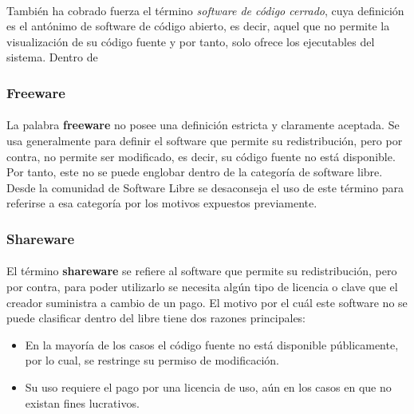 \documentclass[10pt]{article}
\begin{document}
                \paragraph{}
				También ha cobrado fuerza el término \emph{software de código cerrado}, cuya definición es el antónimo de software de código abierto, es decir, aquel que no permite la visualización de su código fuente y por tanto, solo ofrece los ejecutables del sistema. Dentro de 
   
			\subsubsection{Freeware}
               	
               	\paragraph{}
                La palabra \textbf{freeware} no posee una definición estricta y claramente aceptada. Se usa generalmente para definir el software que permite su redistribución, pero por contra, no permite ser modificado, es decir, su código fuente no está disponible. Por tanto, este no se puede englobar dentro de la categoría de software libre. Desde la comunidad de Software Libre se desaconseja el uso de este término para referirse a esa categoría por los motivos expuestos previamente.


			\subsubsection{Shareware}
                
                \paragraph{}
                El término \textbf{shareware} se refiere al software que permite su redistribución, pero por contra, para poder utilizarlo se necesita algún tipo de licencia o clave que el creador suministra a cambio de un pago. El motivo por el cuál este software no se puede clasificar dentro del libre tiene dos razones principales:
                
                \begin{itemize}
	                \item En la mayoría de los casos el código fuente no está disponible públicamente, por lo cual, se restringe su permiso de modificación.
                    \item Su uso requiere el pago por una licencia de uso, aún en los casos en que no existan fines lucrativos.
                \end{itemize}
\end{document}
